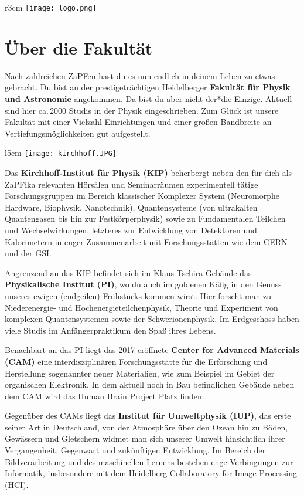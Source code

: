 
\begin{wrapfigure}{r}{3cm}
\texttt{[image: logo.png]}
\end{wrapfigure}

\section{Über die Fakultät}

Nach zahlreichen ZaPFen hast du es nun endlich in deinem Leben zu etwas gebracht. Du bist an der prestigeträchtigen Heidelberger \textbf{Fakultät für Physik und Astronomie} angekommen. Da bist du aber nicht der*die Einzige. Aktuell sind hier ca.\,2000 Studis in der Physik eingeschrieben. Zum Glück ist unsere Fakultät mit einer Vielzahl Einrichtungen und einer großen Bandbreite an Vertiefungsmöglichkeiten gut aufgestellt.

\begin{wrapfigure}{l}{5cm}
\texttt{[image: kirchhoff.JPG]}
\end{wrapfigure}

Das \textbf{Kirchhoff-Institut für Physik (KIP)} beherbergt neben den für dich als ZaPFika relevanten Hörsälen und Seminarräumen experimentell tätige Forschungsgruppen im Bereich klassischer Komplexer System (Neuromorphe Hardware, Biophysik, Nanotechnik), Quantensysteme (von ultrakalten Quantengasen bis hin zur Festkörperphysik) sowie zu Fundamentalen Teilchen und Wechselwirkungen, letzteres zur Entwicklung von Detektoren und Kalorimetern in enger Zusammenarbeit mit Forschungsstätten wie dem CERN und der GSI.

Angrenzend an das KIP befindet sich im Klaus-Tschira-Gebäude das \textbf{Physikalische Institut (PI)}, wo du auch im goldenen Käfig in den Genuss unseres ewigen (endgeilen) Frühstücks kommen wirst. Hier forscht man zu Niederenergie- und Hochenergieteilchenphysik, Theorie und Experiment von komplexen Quantensystemen sowie der Schwerionenphysik. Im Erdgeschoss haben viele Studis im Anfängerpraktikum den Spaß ihres Lebens.

Benachbart an das PI liegt das 2017 eröffnete \textbf{Center for Advanced Materials (CAM)} eine interdisziplinären Forschungsstätte für die Erforschung und Herstellung sogenannter neuer Materialien, wie zum Beispiel im Gebiet der organischen Elektronik.
In dem aktuell noch in Bau befindlichen Gebäude neben dem CAM wird das Human Brain Project Platz finden. 

Gegenüber des CAMs liegt das \textbf{Institut für Umweltphysik (IUP)}, das erste seiner Art in Deutschland, von der Atmosphäre über den Ozean hin zu Böden, Gewässern und Gletschern widmet man sich unserer Umwelt hinsichtlich ihrer Vergangenheit, Gegenwart und zukünftigen Entwicklung. Im Bereich der Bildverarbeitung und des maschinellen Lernens bestehen enge Verbingungen zur Informatik, insbesondere mit dem Heidelberg Collaboratory for Image Processing (HCI).

